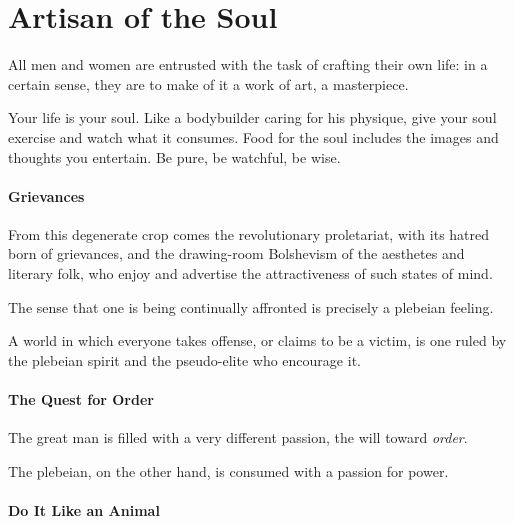 \section{Artisan of the Soul}

\begin{quotex}
All men and women are entrusted with the task of crafting their own life: in a certain sense, they are to make of it a work of art, a masterpiece.
\end{quotex}


Your life is your soul. Like a bodybuilder caring for his physique, give your soul exercise and watch what it consumes. Food for the soul includes the images and thoughts you entertain. Be pure, be watchful, be wise.

\paragraph{Grievances}


\begin{quotex}
From this degenerate crop comes the revolutionary proletariat, with its hatred born of grievances, and the drawing-room Bolshevism of the aesthetes and literary folk, who enjoy and advertise the attractiveness of such states of mind.

The sense that one is being continually affronted is precisely a plebeian feeling.
\end{quotex}


A world in which everyone takes offense, or claims to be a victim, is one ruled by the plebeian spirit and the pseudo-elite who encourage it.

\paragraph{The Quest for Order}


\begin{quotex}
The great man is filled with a very different passion, the will toward \emph{order}.
\end{quotex}


The plebeian, on the other hand, is consumed with a passion for power.

\paragraph{Do It Like an Animal}


